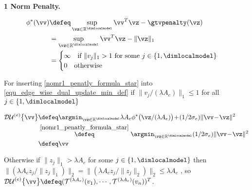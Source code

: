 \documentclass[lettersize,journal]{IEEEtran}
\begin{document}
{\bf 1 Norm Penalty.} %

\begin{align} 
\label{nomr1_penatly_formula_star}
\phi^{*}(\vv) &{\defeq  \sup_{\vz \in \mathbb{R}^{\dimlocalmodel}} \vv^{T}\vz - \gtvpenalty(\vz) }
\nonumber \\
& =  \sup_{\vz \in \mathbb{R}^{\dimlocalmodel}} \vv^{T}\vz - \|\vz\|_1
\nonumber \\
& = \begin{cases}
        \infty \quad \text{if\ } \|v_j\|_1 > 1 \text{ for some $j \in \{1, \dimlocalmodel \}$ }\\
        0 \quad \text{otherwise}\\
     \end{cases}
\nonumber \\
\end{align} 




For inserting \ref{nomr1_penatly_formula_star} into \ref{equ_edge_wise_dual_update_min_def} if 
 $\|v_j/(\lambda A_e)\|_1 \leq 1$ for all $j \in \{1, \dimlocalmodel \}$ 

\begin{align} 
\label{norm1_penatly_dual_update}
\mathcal{DU}^{(e)} \big\{ \vv \big \} &{\defeq \argmin_{\vz \in \mathbb{R}^{\dimlocalmodel}} \lambda A_{e} \phi^{*}\big(\vz/(\lambda A_{e}) \big) \!+\!(1/2\sigma_{e}) \|\vv\!-\!\vz\|^{2}}
\nonumber \\
& \stackrel{\eqref{nomr1_penatly_formula_star}}{\defeq} \argmin_{\vz \in \mathbb{R}^{\dimlocalmodel}} (1/2\sigma_{e}) \|\vv\!-\!\vz\|^{2}
\nonumber \\
& \defeq \vv
\end{align} 

Otherwise if $\|z_j\|_1 > \lambda A_{e}$ for some $j \in \{1, \dimlocalmodel \}$ then $\| (\lambda A_{e} z_j/\|z_j\|_{1}) \|_2 = \| (\lambda A_{e} z_j/\|z_j\|_{2}) \|_2  \leq \lambda A_{e}$ , so $\mathcal{DU}^{(e)}  \big\{ \vv \big \} \defeq ( \mathcal{T}^{(\lambda A_{e})} ( v_1 ), \cdots, \mathcal{T}^{(\lambda A_{e})} ( v_n ) )^T $.
\end{document}
